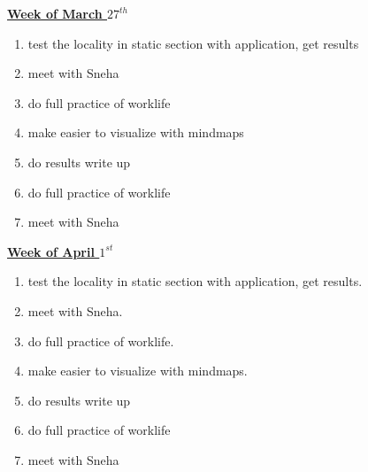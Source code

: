 \underline{\textbf{Week of March $27^{th}$}} \\
\begin{enumerate}

\item test the locality in static section with application, get results
\item meet with Sneha
\item do full practice of worklife
\item make easier to visualize with mindmaps

\item  do results write up
\item  do full practice of worklife
\item  meet with Sneha
\end{enumerate}



\underline{\textbf{Week of April $1^{st}$}} \\
\begin{enumerate}

\item test the locality in static section with application, get results.
\item meet with Sneha.
\item do full practice of worklife.
\item make easier to visualize with mindmaps.



\item  do results write up
\item  do full practice of worklife
\item  meet with Sneha
\end{enumerate}
